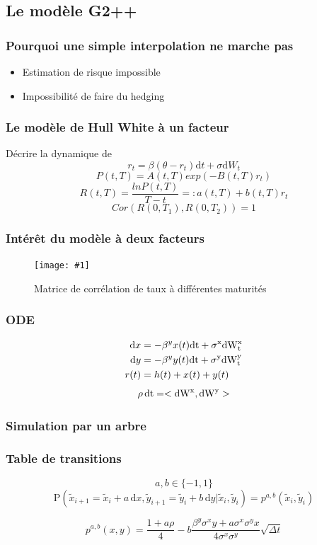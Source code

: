 \documentclass{beamer}
\newcommand{\IMG}[3]{
  \begin{figure}[H]
    \centering
    \texttt{[image: \#1]}%
    \caption{#2}
    \label{#1}
  \end{figure}
}
\begin{document}
\subsection{Le modèle G2++}
\begin{frame}
  \frametitle{Pourquoi une simple interpolation ne marche pas}
  \begin{itemize}
  \item Estimation de risque impossible
  \item Impossibilité de faire du hedging
  \end{itemize}
\end{frame}

\begin{frame}
  \frametitle{Le modèle de Hull White à un facteur}
  Décrire la dynamique de 
$$r_t = \beta (\theta - r_t)  \mathrm{d}t  + \sigma \mathrm{d}W_t$$
$$P(t, T) = A(t, T) exp(-B(t, T) r_t)$$
 {$$R(t, T) = \frac{ln P(t, T)}{T-t} =: a(t, T) + b(t, T) r_t$$
$$Cor(R(0, T_1), R(0, T_2)) = 1$$}
\end{frame}

\begin{frame}
  \frametitle{Intérêt du modèle à deux facteurs}
\IMG{img/tabcorr.png}{Matrice de corrélation de taux à différentes maturités}{0.3}
\end{frame}

\begin{frame}
\frametitle{ODE}
\begin{align*}
  \mathrm{d}x &= -\beta^y x(t) \rm{d}t + \sigma^x \rm{d}W^x_t \\
  \mathrm{d}y &= -\beta^y y(t) \rm{d}t + \sigma^y \rm{d}W^y_t \\
  r(t) &= h(t) + x(t) + y(t)
\end{align*}
$$\rho \, \rm{d}t = < \rm{d} W^x, \rm{d} W^y >$$
\end{frame}

\begin{frame}
  \frametitle{Simulation par un arbre}
  
\end{frame}

\begin{frame}
  \frametitle{Table de transitions}
  $$a, b \in \{-1, 1\}$$
  $$\mathrm{P} \left( \widetilde{x}_{i+1} = \widetilde{x}_i + a \, \mathrm{d}x, \widetilde{y}_{i+1} = \widetilde{y}_i + b \, \mathrm{d}y |  \widetilde{x}_i, \widetilde{y}_i \right) = p^{a, b}( \widetilde{x}_i, \widetilde{y}_i)$$
  
$$ p^{a, b}(x, y) = \frac{1 + a \rho}{4} - b \frac{\beta^y \sigma^x y + a \sigma^x \sigma^y  x}{4 \sigma^x \sigma^y} \sqrt{\Delta t} $$
\end{frame}
\end{document}
